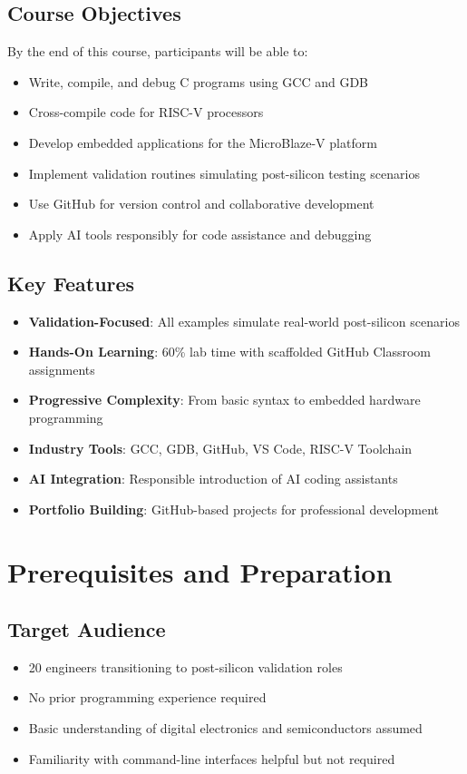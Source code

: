 \documentclass[11pt,a4paper]{article}
\begin{document}
\subsection{Course Objectives}
By the end of this course, participants will be able to:
\begin{itemize}
    \item Write, compile, and debug C programs using GCC and GDB
    \item Cross-compile code for RISC-V processors
    \item Develop embedded applications for the MicroBlaze-V platform
    \item Implement validation routines simulating post-silicon testing scenarios
    \item Use GitHub for version control and collaborative development
    \item Apply AI tools responsibly for code assistance and debugging
\end{itemize}

\subsection{Key Features}
\begin{itemize}
    \item \textbf{Validation-Focused}: All examples simulate real-world post-silicon scenarios
    \item \textbf{Hands-On Learning}: 60\% lab time with scaffolded GitHub Classroom assignments
    \item \textbf{Progressive Complexity}: From basic syntax to embedded hardware programming
    \item \textbf{Industry Tools}: GCC, GDB, GitHub, VS Code, RISC-V Toolchain
    \item \textbf{AI Integration}: Responsible introduction of AI coding assistants
    \item \textbf{Portfolio Building}: GitHub-based projects for professional development
\end{itemize}

\section{Prerequisites and Preparation}

\subsection{Target Audience}
\begin{itemize}
    \item 20 engineers transitioning to post-silicon validation roles
    \item No prior programming experience required
    \item Basic understanding of digital electronics and semiconductors assumed
    \item Familiarity with command-line interfaces helpful but not required
\end{itemize}
\end{document}
